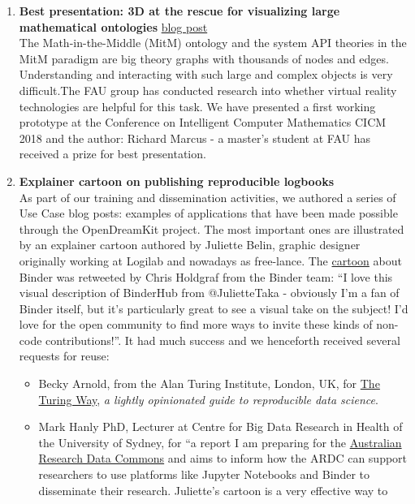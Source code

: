 \begin{enumerate}
\item \textbf{Best presentation: 3D at the rescue for visualizing large mathematical ontologies}
  \href{https://opendreamkit.org/2018/08/20/tgview3d.md}{blog post}\\
  The Math-in-the-Middle (MitM) ontology and the system API theories
  in the MitM paradigm are big theory graphs with thousands of nodes
  and edges. Understanding and interacting with such large and complex
  objects is very difficult.The FAU group has conducted research into
  whether virtual reality technologies are helpful for this task. We
  have presented a first working prototype at the Conference on
  Intelligent Computer Mathematics CICM 2018 and the author: Richard
  Marcus - a master's student at FAU has received a prize for best
  presentation.
\item \textbf{Explainer cartoon on publishing reproducible logbooks}\\
  As part of our training and dissemination activities, we authored a
  series of Use Case blog posts: examples of applications that have
  been made possible through the OpenDreamKit project. The most
  important ones are illustrated by an explainer cartoon authored by
  Juliette Belin, graphic designer originally working at Logilab and
  nowadays as free-lance. The
  \href{https://opendreamkit.org/2017/11/02/use-case-publishing-reproducible-notebooks/}{cartoon}
  about Binder was retweeted by Chris Holdgraf from the Binder team:
  ``I love this visual description of BinderHub from @JulietteTaka -
  obviously I'm a fan of Binder itself, but it's particularly great to
  see a visual take on the subject! I'd love for the open community to
  find more ways to invite these kinds of non-code contributions!''.
  It had much success and we henceforth received several requests for
  reuse:
  \begin{itemize}
  \item Becky Arnold, from the Alan Turing Institute, London, UK, for
    \href{https://the-turing-way.netlify.com/reproducible_environments/04/binder/}{The
      Turing Way}, \emph{a lightly opinionated guide to reproducible
      data science}.
  \item Mark Hanly PhD, Lecturer at Centre for Big Data Research in
    Health of the University of Sydney, for ``a report I am preparing
    for the \href{https://ardc.edu.au/}{Australian Research Data
      Commons} and aims to inform how the ARDC can support researchers
    to use platforms like Jupyter Notebooks and Binder to disseminate
    their research. Juliette's cartoon is a very effective way to

\end{itemize}
\end{enumerate}
